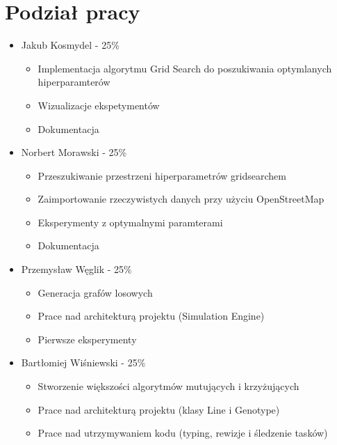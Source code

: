 \documentclass[12pt,a4paper]{article}
\begin{document}
\section{Podział pracy}
\begin{itemize}
    \item Jakub Kosmydel - 25\%
    \begin{itemize}
        \item Implementacja algorytmu Grid Search do poszukiwania optymlanych hiperparamterów
        \item Wizualizacje ekspetymentów
        \item Dokumentacja
    \end{itemize}
    \item Norbert Morawski - 25\%
    \begin{itemize}
        \item Przeszukiwanie przestrzeni hiperparametrów gridsearchem
        \item Zaimportowanie rzeczywistych danych przy użyciu OpenStreetMap
        \item Eksperymenty z optymalnymi paramterami
        \item Dokumentacja
    \end{itemize}
    \item Przemysław Węglik - 25\%
    \begin{itemize}
        \item Generacja grafów losowych
        \item Prace nad architekturą projektu (Simulation Engine)
        \item Pierwsze eksperymenty
    \end{itemize}
    \item Bartłomiej Wiśniewski - 25\%
    \begin{itemize}
        \item Stworzenie większości algorytmów mutujących i krzyżujących
        \item Prace nad architekturą projektu (klasy Line i Genotype)
        \item Prace nad utrzymywaniem kodu (typing, rewizje i śledzenie tasków)
    \end{itemize}
\end{itemize}
\end{document}
